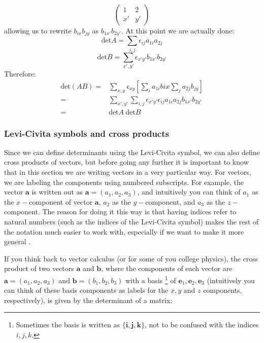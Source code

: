 \[ \left( \begin{array}{cc}
1 & 2   \\
x' &y'
\end{array} \right)
\]
allowing us to rewrite $b_{ix}b_{jy}$ as $ b_{1x'}b_{2y'}$.  At this point we are actually done:
\[
\text{det}A=\sum_{i,j} \epsilon_{ij} a_{1i}a_{2j}
\]
\[
\text{det}B=\sum_{x',y'} \epsilon_{x'y'} b_{1x'}b_{2y'}
\]
Therefore:
\begin{align*}
\text{det}(AB)=& \sum_{x,y} \epsilon_{xy} \left[ \sum_i a_{1i}b{ix} \sum_j a_{2j}b_{jy}\right]\\
=&\sum_{x',y'}  \sum_{i,j} \epsilon_{x'y'}\epsilon_{ij}   a_{1i}a_{2j} b_{1x'}b_{2y'}\\
=& \text{det}A ~\text{det}B
\end{align*}




\subsubsection*{Levi-Civita symbols and cross products}
Since we can define determinants using the Levi-Civita symbol, we can also define cross products of vectors, but before going any further it is important to know that in this section we are writing vectors in a very particular way.  For vectors, we are labeling the components using numbered subscripts.  For example, the vector $\textbf{a}$ is written out as $\textbf{a}=(a_1, a_2, a_3)$, and intuitively you can think of $a_1$ as the $x-$component of vector $\textbf{a}$, $a_2$ as the $y-$component, and $a_3$ as the $z-$component.  The reason for doing it this way is that having indices refer to natural numbers (such as the indices of the Levi-Civita symbol) makes the rest of the notation much easier to work with, especially if we want to make it more general .   

If you think back to vector calculus (or for some of you college physics), the cross product of two vectors $\textbf{a}$ and $\textbf{b}$, where the components of each vector are $\textbf{a}=(a_1, a_2, a_3)$ and $\textbf{b}=(b_1, b_2, b_3)$ with a basis \footnote{Sometimes the basis is written as $\{ \textbf{i}, \textbf{j},\textbf{k} \}$, not to be confused with the indices $i,j,k$.} of $\textbf{e}_1, \textbf{e}_2, \textbf{e}_3$ (intuitively you can think of these basis components as labels for the $x,y$ and $z$ components, respectively), is given by the determinant of a matrix:

